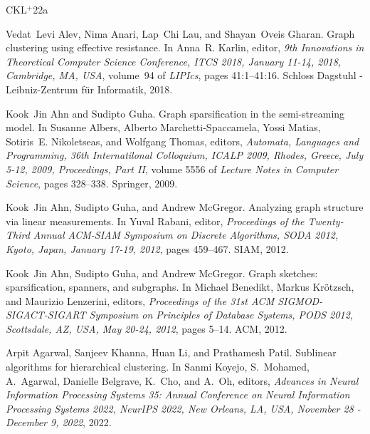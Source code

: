 \documentclass[epsfig,letter,11pt]{article}
\numberwithin{equation}{section}
\begin{document}
\newpage


\newcommand{\etalchar}[1]{$^{#1}$}
\begin{thebibliography}{CKL{\etalchar{+}}22a}

Vedat~Levi Alev, Nima Anari, Lap~Chi Lau, and Shayan~Oveis Gharan.
\newblock Graph clustering using effective resistance.
\newblock In Anna~R. Karlin, editor, {\em 9th Innovations in Theoretical
  Computer Science Conference, {ITCS} 2018, January 11-14, 2018, Cambridge, MA,
  {USA}}, volume~94 of {\em LIPIcs}, pages 41:1--41:16. Schloss Dagstuhl -
  Leibniz-Zentrum f{\"{u}}r Informatik, 2018.

Kook~Jin Ahn and Sudipto Guha.
\newblock Graph sparsification in the semi-streaming model.
\newblock In Susanne Albers, Alberto Marchetti{-}Spaccamela, Yossi Matias,
  Sotiris~E. Nikoletseas, and Wolfgang Thomas, editors, {\em Automata,
  Languages and Programming, 36th Internatilonal Colloquium, {ICALP} 2009,
  Rhodes, Greece, July 5-12, 2009, Proceedings, Part {II}}, volume 5556 of {\em
  Lecture Notes in Computer Science}, pages 328--338. Springer, 2009.

Kook~Jin Ahn, Sudipto Guha, and Andrew McGregor.
\newblock Analyzing graph structure via linear measurements.
\newblock In Yuval Rabani, editor, {\em Proceedings of the Twenty-Third Annual
  {ACM-SIAM} Symposium on Discrete Algorithms, {SODA} 2012, Kyoto, Japan,
  January 17-19, 2012}, pages 459--467. {SIAM}, 2012.

Kook~Jin Ahn, Sudipto Guha, and Andrew McGregor.
\newblock Graph sketches: sparsification, spanners, and subgraphs.
\newblock In Michael Benedikt, Markus Kr{\"{o}}tzsch, and Maurizio Lenzerini,
  editors, {\em Proceedings of the 31st {ACM} {SIGMOD-SIGACT-SIGART} Symposium
  on Principles of Database Systems, {PODS} 2012, Scottsdale, AZ, USA, May
  20-24, 2012}, pages 5--14. {ACM}, 2012.

Arpit Agarwal, Sanjeev Khanna, Huan Li, and Prathamesh Patil.
\newblock Sublinear algorithms for hierarchical clustering.
\newblock In Sanmi Koyejo, S.~Mohamed, A.~Agarwal, Danielle Belgrave, K.~Cho,
  and A.~Oh, editors, {\em Advances in Neural Information Processing Systems
  35: Annual Conference on Neural Information Processing Systems 2022, NeurIPS
  2022, New Orleans, LA, USA, November 28 - December 9, 2022}, 2022.


\end{thebibliography}
\end{document}
